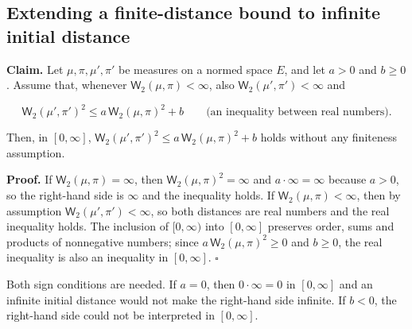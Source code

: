 \documentclass[11pt,a4paper]{report}
\begin{document}
\subsection{\texorpdfstring{Extending a finite-distance bound to infinite initial distance}{Extending a finite-distance bound to infinite initial distance}}
\label{report-step-AverageLMC-ExtendedTransport-lean-1}


\textbf{Claim.} Let \(\mu,\pi,\mu',\pi'\) be measures on a normed space \(E\), and let \(a>0\) and \(b\ge0\). Assume that, whenever \(\mathsf W_2(\mu,\pi)<\infty\), also \(\mathsf W_2(\mu',\pi')<\infty\) and


\[\mathsf W_2(\mu',\pi')^2\le a\,\mathsf W_2(\mu,\pi)^2+b\qquad\text{(an inequality between real numbers).}\]


Then, in \([0,\infty]\), \(\mathsf W_2(\mu',\pi')^2\le a\,\mathsf W_2(\mu,\pi)^2+b\) holds without any finiteness assumption.




\textbf{Proof.} If \(\mathsf W_2(\mu,\pi)=\infty\), then \(\mathsf W_2(\mu,\pi)^2=\infty\) and \(a\cdot\infty=\infty\) because \(a>0\), so the right-hand side is \(\infty\) and the inequality holds. If \(\mathsf W_2(\mu,\pi)<\infty\), then by assumption \(\mathsf W_2(\mu',\pi')<\infty\), so both distances are real numbers and the real inequality holds. The inclusion of \([0,\infty)\) into \([0,\infty]\) preserves order, sums and products of nonnegative numbers; since \(a\,\mathsf W_2(\mu,\pi)^2\ge0\) and \(b\ge0\), the real inequality is also an inequality in \([0,\infty]\). \(\square\)




Both sign conditions are needed. If \(a=0\), then \(0\cdot\infty=0\) in \([0,\infty]\) and an infinite initial distance would not make the right-hand side infinite. If \(b<0\), the right-hand side could not be interpreted in \([0,\infty]\).
\end{document}
